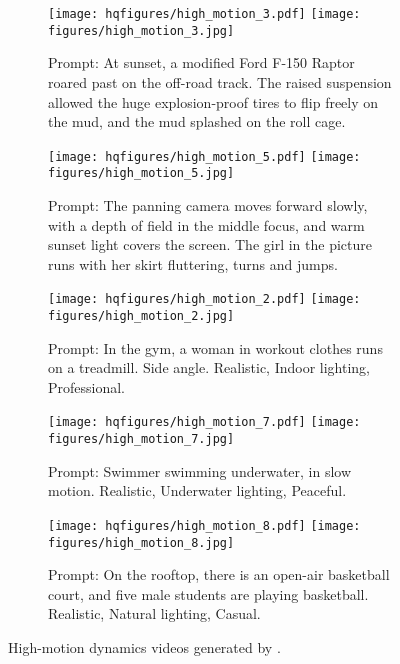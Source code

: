 \begin{figure}[!htbp]
    \centering
    \begin{subfigure}{\textwidth}
        \centering
        \ifhq
        \texttt{[image: hqfigures/high\_motion\_3.pdf]}
        \else
        \texttt{[image: figures/high\_motion\_3.jpg]}
        \fi
        \captionsetup{font=small}
        \caption{Prompt: At sunset, a modified Ford F-150 Raptor roared past on the off-road track. The raised suspension allowed the huge explosion-proof tires to flip freely on the mud, and the mud splashed on the roll cage.}
        \label{fig:hm_1}
    \end{subfigure}
    \hfill
    \begin{subfigure}{\textwidth}
        \centering
        \ifhq
        \texttt{[image: hqfigures/high\_motion\_5.pdf]}
        \else
        \texttt{[image: figures/high\_motion\_5.jpg]}
        \fi
        \captionsetup{font=small}
        \caption{Prompt: The panning camera moves forward slowly, with a depth of field in the middle focus, and warm sunset light covers the screen. The girl in the picture runs with her skirt fluttering, turns and jumps.}
        \label{fig:hm_2}
    \end{subfigure}
    \hfill
    \begin{subfigure}{\textwidth}
        \centering
        \ifhq
        \texttt{[image: hqfigures/high\_motion\_2.pdf]}
        \else
        \texttt{[image: figures/high\_motion\_2.jpg]}
        \fi
        \captionsetup{font=small}
        \caption{Prompt: In the gym, a woman in workout clothes runs on a treadmill. Side angle. Realistic, Indoor lighting, Professional.}
        \label{fig:hm_3}
    \end{subfigure}
    \hfill
    \begin{subfigure}{\textwidth}
        \centering
        \ifhq
        \texttt{[image: hqfigures/high\_motion\_7.pdf]}
        \else
        \texttt{[image: figures/high\_motion\_7.jpg]}
        \fi
        \captionsetup{font=small}
        \caption{Prompt: Swimmer swimming underwater, in slow motion. Realistic, Underwater lighting, Peaceful.}
        \label{fig:hm_4}
    \end{subfigure}
    \hfill
    \begin{subfigure}{\textwidth}
        \centering
        \ifhq
        \texttt{[image: hqfigures/high\_motion\_8.pdf]}
        \else
        \texttt{[image: figures/high\_motion\_8.jpg]}
        \fi
        \captionsetup{font=small}
        \caption{Prompt: On the rooftop, there is an open-air basketball court, and five male students are playing basketball. Realistic, Natural lighting, Casual.}
        \label{fig:hm_5}
    \end{subfigure}
    \caption{High-motion dynamics videos generated by \nameofmethod{}.}
    \label{fig:high_motion}
\end{figure}


